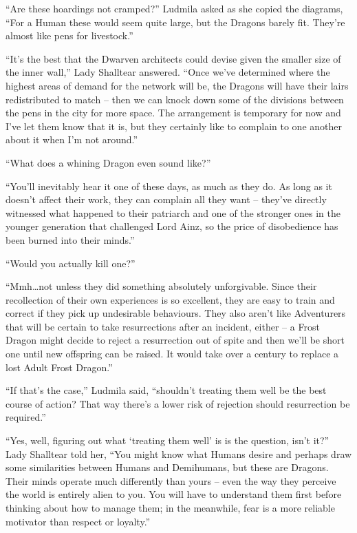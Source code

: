  

“Are these hoardings not cramped?” Ludmila asked as she copied the diagrams, “For a Human these would seem quite large, but the Dragons barely fit. They’re almost like pens for livestock.”

 

“It’s the best that the Dwarven architects could devise given the smaller size of the inner wall,” Lady Shalltear answered. “Once we’ve determined where the highest areas of demand for the network will be, the Dragons will have their lairs redistributed to match – then we can knock down some of the divisions between the pens in the city for more space. The arrangement is temporary for now and I’ve let them know that it is, but they certainly like to complain to one another about it when I’m not around.”

 

“What does a whining Dragon even sound like?”

 

“You’ll inevitably hear it one of these days, as much as they do. As long as it doesn’t affect their work, they can complain all they want – they’ve directly witnessed what happened to their patriarch and one of the stronger ones in the younger generation that challenged Lord Ainz, so the price of disobedience has been burned into their minds.”

 

“Would you actually kill one?”

 

“Mmh…not unless they did something absolutely unforgivable. Since their recollection of their own experiences is so excellent, they are easy to train and correct if they pick up undesirable behaviours. They also aren’t like Adventurers that will be certain to take resurrections after an incident, either – a Frost Dragon might decide to reject a resurrection out of spite and then we’ll be short one until new offspring can be raised. It would take over a century to replace a lost Adult Frost Dragon.”

 

“If that’s the case,” Ludmila said, “shouldn’t treating them well be the best course of action? That way there’s a lower risk of rejection should resurrection be required.”

 

“Yes, well, figuring out what ‘treating them well’ is is the question, isn’t it?” Lady Shalltear told her, “You might know what Humans desire and perhaps draw some similarities between Humans and Demihumans, but these are Dragons. Their minds operate much differently than yours – even the way they perceive the world is entirely alien to you. You will have to understand them first before thinking about how to manage them; in the meanwhile, fear is a more reliable motivator than respect or loyalty.”

